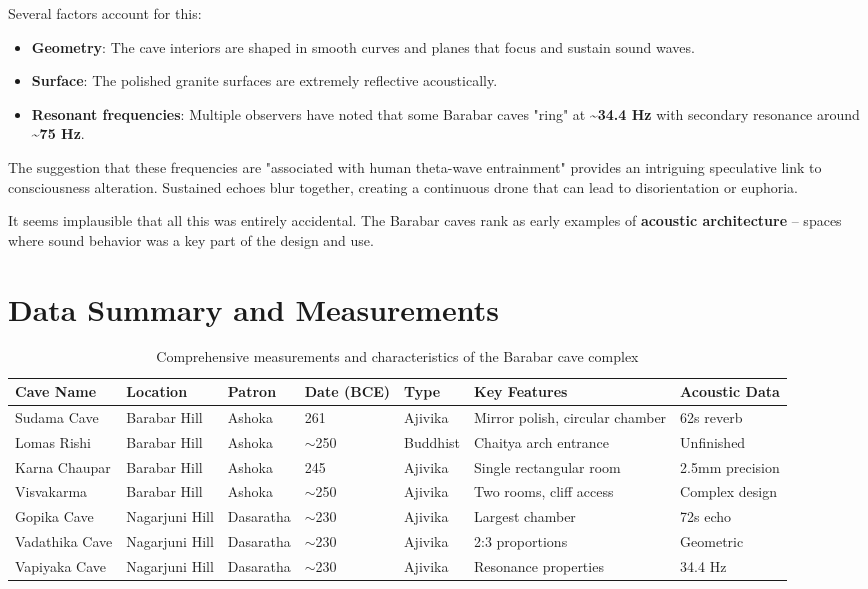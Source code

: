 \documentclass[11pt]{article}
\begin{document}
Several factors account for this:

\begin{itemize}
\item \textbf{Geometry}: The cave interiors are shaped in smooth curves and planes that focus and sustain sound waves.
\item \textbf{Surface}: The polished granite surfaces are extremely reflective acoustically.
\item \textbf{Resonant frequencies}: Multiple observers have noted that some Barabar caves "ring" at \textbf{\textasciitilde 34.4 Hz} with secondary resonance around \textbf{\textasciitilde 75 Hz}.
\end{itemize}

The suggestion that these frequencies are "associated with human theta-wave entrainment" provides an intriguing speculative link to consciousness alteration. Sustained echoes blur together, creating a continuous drone that can lead to disorientation or euphoria.

It seems implausible that all this was entirely accidental. The Barabar caves rank as early examples of \textbf{acoustic architecture} -- spaces where sound behavior was a key part of the design and use.

\section{Data Summary and Measurements}

\begin{table}[H]
\centering
\caption{Comprehensive measurements and characteristics of the Barabar cave complex}
\label{tab:cave_data}
\footnotesize
\begin{tabular}{@{}p{2.2cm}p{1.8cm}p{1.3cm}p{1.3cm}p{1.8cm}p{2.5cm}p{1.8cm}@{}}
\toprule
\textbf{Cave Name} & \textbf{Location} & \textbf{Patron} & \textbf{Date (BCE)} & \textbf{Type} & \textbf{Key Features} & \textbf{Acoustic Data} \\
\midrule
Sudama Cave & Barabar Hill & Ashoka & 261 & Ajivika & Mirror polish, circular chamber & 62s reverb \\
Lomas Rishi & Barabar Hill & Ashoka & $\sim$250 & Buddhist & Chaitya arch entrance & Unfinished \\
Karna Chaupar & Barabar Hill & Ashoka & 245 & Ajivika & Single rectangular room & 2.5mm precision \\
Visvakarma & Barabar Hill & Ashoka & $\sim$250 & Ajivika & Two rooms, cliff access & Complex design \\
Gopika Cave & Nagarjuni Hill & Dasaratha & $\sim$230 & Ajivika & Largest chamber & 72s echo \\
Vadathika Cave & Nagarjuni Hill & Dasaratha & $\sim$230 & Ajivika & 2:3 proportions & Geometric \\
Vapiyaka Cave & Nagarjuni Hill & Dasaratha & $\sim$230 & Ajivika & Resonance properties & 34.4 Hz \\
\bottomrule
\end{tabular}
\end{table}
\end{document}
